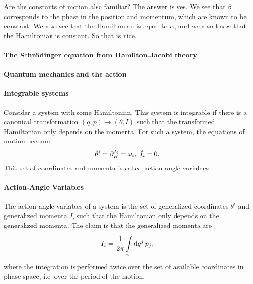 Are the constants of motion also familiar? The answer is yes. We see that $\beta$ corresponds to the phase in the position and momentum, which are known to be constant. We also see that the Hamiltonian is equal to $\alpha$, and we also know that the Hamiltonian is constant. So that is nice.


\paragraph{The Schrödinger equation from Hamilton-Jacobi theory}

\paragraph{Quantum mechanics and the action}

\paragraph{Integrable systems}
Consider a system with some Hamiltonian. This system is integrable if there is a canonical transformation $(q, p)\to (\theta, I)$ such that the transformed Hamiltonian only depends on the momenta. For such a system, the equations of motion become
\begin{align*}
	\dot{\theta}^{i} = \partial^{I_{i}}_{H} = \omega_{i},\ \dot{I}_{i} = 0.
\end{align*}
This set of coordinates and momenta is called action-angle variables.

\paragraph{Action-Angle Variables}
The action-angle variables of a system is the set of generalized coordinates $\theta^{i}$ and generalized momenta $I_{i}$ such that the Hamiltonian only depends on the generalized momenta. The claim is that the generalized momenta are
\begin{align*}
	I_{i} = \frac{1}{2\pi}\int\limits_{\gamma_{i}}^{}\dd{q^{j}}{p_{j}},
\end{align*}
where the integration is performed twice over the set of available coordinates in phase space, i.e. over the period of the motion.

